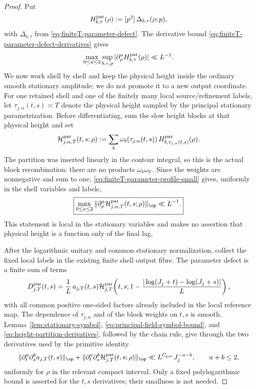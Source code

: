 \begin{proof}
Put
\[
H_{b,\tau}^{\rm par}(\rho)
:=[p^2]\,\Delta_{b,\tau}(\rho;p),
\]
with $\Delta_{b,\tau}$ from \eqref{eq:finiteT-parameter-defect}.  The derivative
bound \eqref{eq:finiteT-parameter-defect-derivatives} gives
\begin{equation}
\max_{0\le a\le2}\sup_{b,\tau,\rho}
|\partial_\rho^aH_{b,\tau}^{\rm par}(\rho)|\ll L^{-1}.
\label{eq:finiteT-parameter-profile-small}
\end{equation}
We now work shell by shell and keep the physical height inside the ordinary
smooth stationary amplitude; we do not promote it to a new output coordinate.
For one retained shell and one of the finitely many local source/refinement
labels, let $\tau_{j,\alpha}(t,s)\asymp T$ denote the physical height sampled by
the principal stationary parametrization.  Before differentiating, sum the
slow height blocks at that physical height and set
\begin{equation}
\mathcal H^{\rm par}_{j,\alpha,T}(t,s;\rho)
:=\sum_b\omega_b\!\left(\tau_{j,\alpha}(t,s)\right)
 H^{\rm par}_{b,\tau_{j,\alpha}(t,s)}(\rho).
\label{eq:finiteT-parameter-shell-profile}
\end{equation}
The partition was inserted linearly in the contour integral, so this is the
actual block recombination: there are no products
$\omega_b\omega_{b'}$.  Since the weights are nonnegative and sum to one,
\eqref{eq:finiteT-parameter-profile-small} gives, uniformly in the shell
variables and labels,
\begin{equation}
\boxed{
\max_{0\le a\le2}
\|\partial_\rho^a\mathcal H^{\rm par}_{j,\alpha,T}(t,s;\rho)\|_{\op}
\ll L^{-1}.
}
\label{eq:finiteT-parameter-operator-profile}
\end{equation}
This statement is local in the stationary variables and makes no assertion
that physical height is a function only of the final lag.

After the logarithmic unitary and common stationary normalization, collect the
fixed local labels in the existing finite shell output fibre.  The parameter
defect is a finite sum of terms
\begin{equation}
D_{j,T}^{\rm par}(t,s)
=\frac1L\,a_{j,T}(t,s)
 \mathcal H^{\rm par}_{j,T}\!\left(t,s;
 1-\frac{|\log(J_j+t)-\log(J_j+s)|}{L}\right),
\label{eq:finiteT-parameter-shell-kernel}
\end{equation}
with all common positive one-sided factors already included in the local
reference map.  The dependence of $\tau_{j,\alpha}$ and of the block weights on
$t,s$ is smooth.  Lemma~\ref{lem:stationary-symbol},
\eqref{eq:principal-field-symbol-bound}, and
\eqref{eq:height-partition-derivatives}, followed by the chain rule, give
through the two derivatives used by the primitive identity
\begin{equation}
\|\partial_t^a\partial_s^b a_{j,T}(t,s)\|_{\op}
+\|\partial_t^a\partial_s^b
  \mathcal H^{\rm par}_{j,T}(t,s;\rho)\|_{\op}
\ll L^{C_{\rm par}}J_j^{-a-b},
\qquad a+b\le2,
\label{eq:finiteT-parameter-amplitude-symbol}
\end{equation}
uniformly for $\rho$ in the relevant compact interval.  Only a fixed
polylogarithmic bound is asserted for the $t,s$ derivatives; their smallness is
not needed.


\end{proof}
